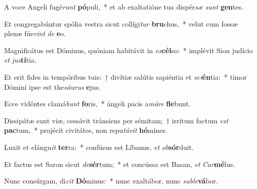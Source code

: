 \item A voce Angeli fugé\textit{runt} \textbf{pó}puli,~* et ab exaltatióne tua dispér\textit{sæ} \textit{sunt} \textbf{gen}tes.
\item Et congregabúntur spólia vestra sicut collígi\textit{tur} \textbf{bru}chus,~* velut cum fossæ plenæ fúe\textit{rint} \textit{de} \textbf{e}o.
\item Magnificátus est Dóminus, quóniam habitávit in \textit{ex}\textbf{cél}so:~* implévit Sion judício \textit{et} \textit{jus}\textbf{tí}tia.
\item Et erit fides in tempóribus tuis:~† divítiæ salútis sapiéntia et \textit{sci}\textbf{én}tia:~* timor Dómini ipse est the\textit{sáu}\textit{rus} \textbf{e}jus.
\item Ecce vidéntes clamá\textit{bunt} \textbf{fo}ris,~* ángeli pacis a\textit{má}\textit{re} \textbf{fle}bunt.
\item Dissipátæ sunt viæ, cessávit tránsiens per sémitam;~† irritum factum \textit{est} \textbf{pac}tum,~* projécit civitátes, non repu\textit{tá}\textit{vit} \textbf{hó}mines.
\item Luxit et elángu\textit{it} \textbf{ter}ra:~* confúsus est Líbanus, \textit{et} \textit{ob}\textbf{sór}duit.
\item Et factus est Saron sicut \textit{de}\textbf{sér}tum;~* et concússa est Basan, \textit{et} \textit{Car}\textbf{mé}lus.
\item Nunc consúrgam, di\textit{cit} \textbf{Dó}minus:~* nunc exaltábor, nunc \textit{sub}\textit{le}\textbf{vá}bor.
